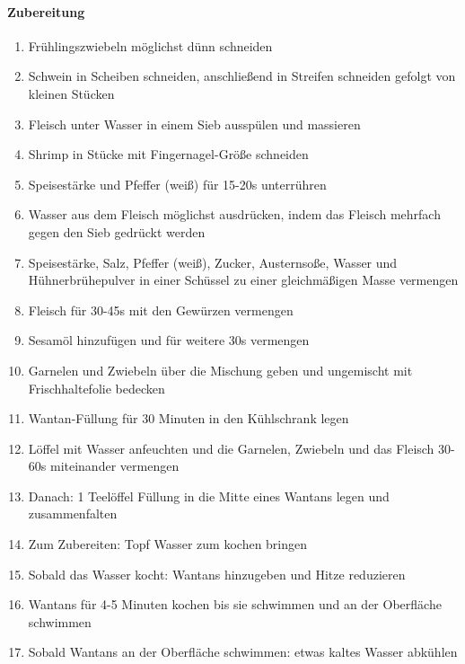 \paragraph{Zubereitung}
\begin{enumerate}[noitemsep]
	\item Frühlingszwiebeln möglichst dünn schneiden
	\item Schwein in Scheiben schneiden, anschließend in Streifen schneiden gefolgt von kleinen Stücken
	\item Fleisch unter Wasser in einem Sieb ausspülen und massieren
	\item Shrimp in Stücke mit Fingernagel-Größe schneiden
	\item Speisestärke und Pfeffer (weiß) für 15-20s unterrühren
	\item Wasser aus dem Fleisch möglichst ausdrücken, indem das Fleisch mehrfach gegen den Sieb gedrückt werden
	\item Speisestärke, Salz, Pfeffer (weiß), Zucker, Austernsoße, Wasser und Hühnerbrühepulver in einer Schüssel zu einer gleichmäßigen Masse vermengen
	\item Fleisch für 30-45s mit den Gewürzen vermengen
	\item Sesamöl hinzufügen und für weitere 30s vermengen
	\item Garnelen und Zwiebeln über die Mischung geben und ungemischt mit Frischhaltefolie bedecken
	\item Wantan-Füllung für 30 Minuten in den Kühlschrank legen
	\item Löffel mit Wasser anfeuchten und die Garnelen, Zwiebeln und das Fleisch 30-60s miteinander vermengen
	\item Danach: 1 Teelöffel Füllung in die Mitte eines Wantans legen und zusammenfalten
	\item Zum Zubereiten: Topf Wasser zum kochen bringen
	\item Sobald das Wasser kocht: Wantans hinzugeben und Hitze reduzieren
	\item Wantans für 4-5 Minuten kochen bis sie schwimmen und an der Oberfläche schwimmen
	\item Sobald Wantans an der Oberfläche schwimmen: etwas kaltes Wasser abkühlen
\end{enumerate}